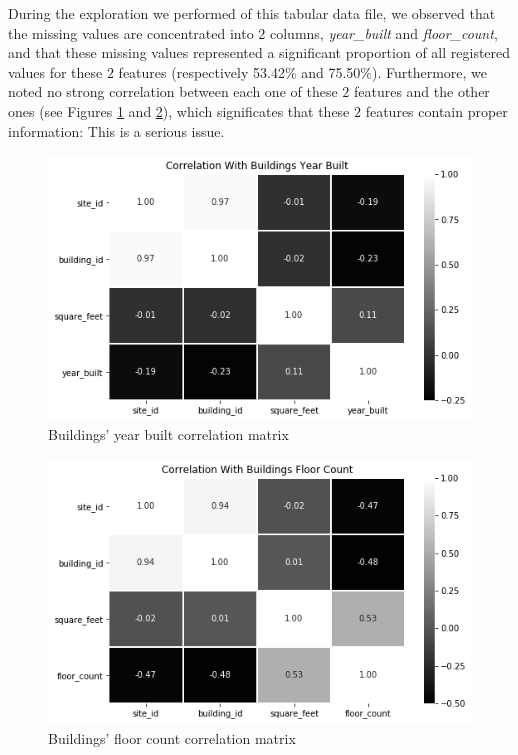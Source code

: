 \documentclass[twocolumn, switch]{article}
\begin{document}
During the exploration we performed of this tabular data file, we observed that the missing values are concentrated into $2$ columns, \textit{year\_built} and \textit{floor\_count}, and that these missing values represented a significant proportion of all registered values for these $2$ features (respectively 53.42\% and 75.50\%). Furthermore, we noted no strong correlation between each one of these $2$ features and the other ones (see Figures \ref{fig:buildings_year_built} and \ref{fig:buildings_floor_count}), which significates that these $2$ features contain proper information: This is a serious issue.

\begin{figure}[H]
\centering
\includegraphics[scale=0.35]{../graphs/buildings_year_built}
\caption{Buildings' year built correlation matrix}
\label{fig:buildings_year_built}
\end{figure}

\begin{figure}[H]
\centering
\includegraphics[scale=0.35]{../graphs/buildings_floor_count}
\caption{Buildings' floor count correlation matrix}
\label{fig:buildings_floor_count}
\end{figure}
\end{document}
